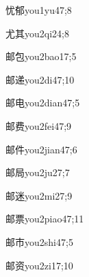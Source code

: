 \begin{verbete}{忧郁}{you1yu4}{7;8}
\end{verbete}

\begin{verbete}{尤其}{you2qi2}{4;8}
\end{verbete}

\begin{verbete}{邮包}{you2bao1}{7;5}
\end{verbete}

\begin{verbete}{邮递}{you2di4}{7;10}
\end{verbete}

\begin{verbete}{邮电}{you2dian4}{7;5}
\end{verbete}

\begin{verbete}{邮费}{you2fei4}{7;9}
\end{verbete}

\begin{verbete}{邮件}{you2jian4}{7;6}
\end{verbete}

\begin{verbete}{邮局}{you2ju2}{7;7}
\end{verbete}

\begin{verbete}{邮迷}{you2mi2}{7;9}
\end{verbete}

\begin{verbete}{邮票}{you2piao4}{7;11}
\end{verbete}

\begin{verbete}{邮市}{you2shi4}{7;5}
\end{verbete}

\begin{verbete}{邮资}{you2zi1}{7;10}
\end{verbete}

